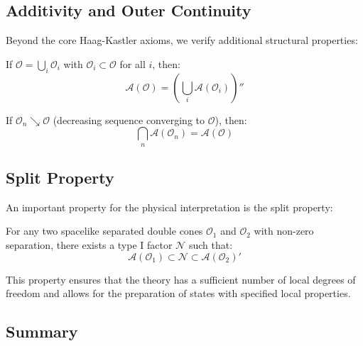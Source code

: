 \subsection{Additivity and Outer Continuity}

Beyond the core Haag-Kastler axioms, we verify additional structural properties:

\begin{theorem}[Additivity]
If $\mathcal{O} = \bigcup_i \mathcal{O}_i$ with $\mathcal{O}_i \subset \mathcal{O}$ for all $i$, then:
\begin{equation}
    \mathcal{A}(\mathcal{O}) = \left( \bigcup_i \mathcal{A}(\mathcal{O}_i) \right)''
\end{equation}
\end{theorem}

\begin{theorem}
If $\mathcal{O}_n \searrow \mathcal{O}$ (decreasing sequence converging to $\mathcal{O}$), then:
\begin{equation}
    \bigcap_n \mathcal{A}(\mathcal{O}_n) = \mathcal{A}(\mathcal{O})
\end{equation}
\end{theorem}

\subsection{Split Property}

An important property for the physical interpretation is the split property:

\begin{theorem}
For any two spacelike separated double cones $\mathcal{O}_1$ and $\mathcal{O}_2$ with non-zero separation, there exists a type I factor $\mathcal{N}$ such that:
\begin{equation}
    \mathcal{A}(\mathcal{O}_1) \subset \mathcal{N} \subset \mathcal{A}(\mathcal{O}_2)'
\end{equation}
\end{theorem}

This property ensures that the theory has a sufficient number of local degrees of freedom and allows for the preparation of states with specified local properties.

\subsection{Summary}


